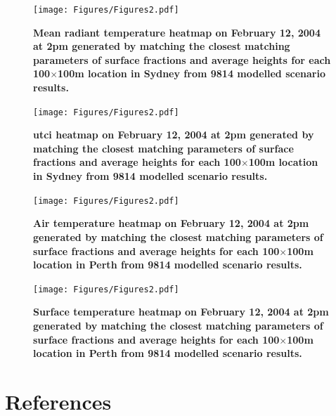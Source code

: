\documentclass[final,3p,times,authoryear]{elsarticle}
\begin{document}
\begin{figure}
\centering
\texttt{[image: Figures/Figures2.pdf]}
\caption{\bf Mean radiant temperature heatmap on February 12, 2004 at 2pm generated by matching the closest matching parameters of surface fractions and average heights for each 100$\times$100m location in Sydney from 9814 modelled scenario results.  }
 \label{fig:dist}
\end{figure}

\begin{figure}
\centering
\texttt{[image: Figures/Figures2.pdf]}
\caption{\bf \gls{utci} heatmap on February 12, 2004 at 2pm generated by matching the closest matching parameters of surface fractions and average heights for each 100$\times$100m location in Sydney from 9814 modelled scenario results.  }
 \label{fig:dist}
\end{figure}

\begin{figure}
\centering
\texttt{[image: Figures/Figures2.pdf]}
\caption{\bf Air temperature heatmap on February 12, 2004 at 2pm generated by matching the closest matching parameters of surface fractions and average heights for each 100$\times$100m location in Perth from 9814 modelled scenario results.  }
 \label{fig:dist}
\end{figure}

\begin{figure}
\centering
\texttt{[image: Figures/Figures2.pdf]}
\caption{\bf Surface temperature heatmap on February 12, 2004 at 2pm generated by matching the closest matching parameters of surface fractions and average heights for each 100$\times$100m location in Perth from 9814 modelled scenario results.  }
 \label{fig:dist}
\end{figure}

\printglossaries

\section*{References}\label{sec:ref}

   
   
\end{document}
